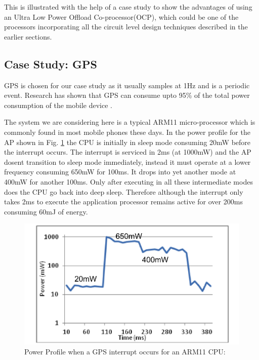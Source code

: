 \documentclass[conference]{IEEEtran}
\begin{document}
This is illustrated with the help of a case study to show the advantages of
using an Ultra Low Power Offload Co-processor(OCP), which could be one of the
processors incorporating all the circuit level design techniques described in the earlier sections.

\subsection{Case Study: GPS}

GPS is chosen for our case study as it usually samples at 1Hz and is a periodic
event. Research has shown that GPS can consume upto 95\% of the total power
consumption of the mobile device \cite{b7}.

The system we are considering here is a typical ARM11 micro-processor which is
commonly found in most mobile phones these days. In the power profile for the AP shown in Fig. \ref{fig:Power_profile_ARM11} the CPU is initially in sleep mode
consuming 20mW before the interrupt occurs. The interrupt is serviced in 2ms (at
1000mW) and the AP dosent transition to sleep mode immediately, instead it must operate
at a lower frequency consuming 650mW for 100ms. It drops into yet another mode at
400mW for another 100ms. Only after executing in all these intermediate modes
does the CPU go back into deep sleep. Therefore although the interrupt only
takes 2ms to execute the application processor remains active for over 200ms
consuming 60mJ of energy.

\begin{figure}[htbp]
	\includegraphics[width=\linewidth]{img/Pictures/Power_profile_ARM11.png}
	\centering
    \caption{Power Profile when a GPS interrupt occurs for an ARM11 CPU: \cite{b2}}
    \label{fig:Power_profile_ARM11}
\end{figure}
\end{document}
